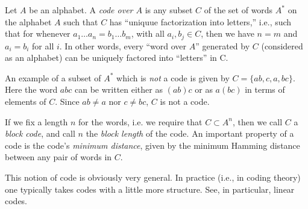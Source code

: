 \documentclass[12pt]{article}
\newcommand{\<}{\langle}
\renewcommand{\>}{\rangle}
\begin{document}
Let $A$ be an alphabet.  A \emph{code over $A$} is any subset $C$ of the set of words $A^*$ on the alphabet $A$ such that $C$ has ``uniquue factorization into letters,'' i.e., such that for whenever $a_1\ldots a_n=b_1\ldots b_m$, with all $a_i,b_j\in C$, then we have $n=m$ and $a_i=b_i$ for all $i$. In other words, every ``word over $A$'' generated by $C$ (considered as an alphabet) can be uniquely factored into ``letters'' in C.  

An example of a subset of $A^*$ which is \emph{not} a code is given by $C=\lbrace ab, c, a, bc \rbrace$. Here the word $abc$ can be written either as $(ab)c$ or as $a(bc)$ in terms of elements of $C$. Since $ab \ne a$ nor $c\ne bc$, $C$ is not a code.

If we fix a length $n$ for the words, i.e. we require that $C\subset A^n$, then we call $C$ a \emph{block code}, and call $n$ the \emph{block length} of the code.  An important property of a code is the code's \emph{minimum distance}, given by the minimum Hamming distance between any pair of words in $C$.

This notion of code is obviously very general.  In practice (i.e., in coding theory) one typically takes codes with a little more structure.  See, in particular, linear codes.
\end{document}
